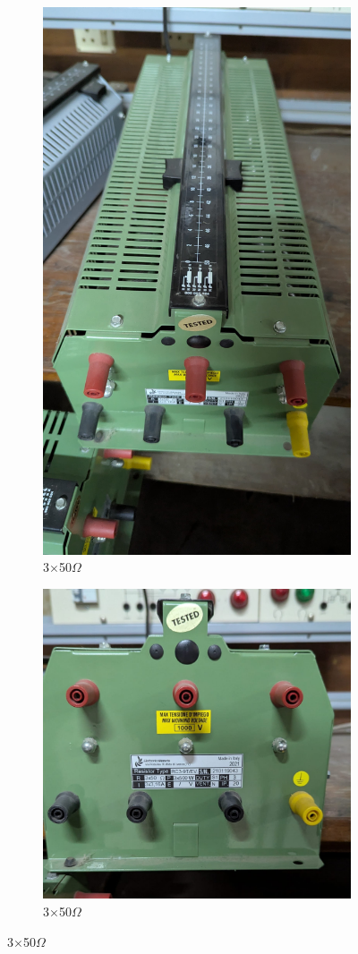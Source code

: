 \documentclass[a4paper,12pt]{article}
\begin{document}
\begin{figure}[H]
\begin{subfigure}[t]{.3\textwidth}
			\includegraphics[width=.7\linewidth]{Images/11}
			\caption{  3$\times$50$\Omega$}
		\end{subfigure}
		\hfill
			\begin{subfigure}[t]{.3\textwidth}
			\centering
			\includegraphics[width=1\linewidth]{Images/12}
			\caption{ 3$\times$50$\Omega$}
		\end{subfigure}
	\end{figure}
\end{document}
